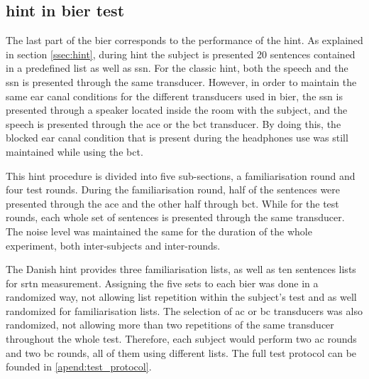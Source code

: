 \subsection{\gls{hint} in \gls{bier} test}
The last part of the \gls{bier} corresponds to the performance of the \gls{hint}. As explained in section \autoref{ssec:hint}, during \gls{hint} the subject is presented 20 sentences contained in a predefined list as well as \gls{ssn}. For the classic \gls{hint}, both the speech and the \gls{ssn} is presented through the same transducer. However, in order to maintain the same ear canal conditions for the different transducers used in \gls{bier}, the \gls{ssn} is presented through a speaker located inside the room with the subject, and the speech is presented through the  \gls{ace} or the \gls{bct} transducer. By doing this, the blocked ear canal condition that is present during the headphones use was still maintained while using the \gls{bct}.


This \gls{hint} procedure is divided into five sub-sections, a familiarisation round and four test rounds. During the familiarisation round, half of the sentences were presented through the \gls{ace} and the other half through \gls{bct}. While for the test rounds, each whole set of sentences is presented through the same transducer. The noise level was maintained the same for the duration of the whole experiment, both inter-subjects and inter-rounds.

The Danish \gls{hint} provides three familiarisation lists, as well as ten sentences lists for \gls{srtn} measurement. Assigning the five sets to each \gls{bier} was done in a randomized way, not allowing list repetition within the subject's test and as well randomized for familiarisation lists. The selection of \gls{ac} or \gls{bc} transducers was also randomized, not allowing more than two repetitions of the same transducer throughout the whole test. Therefore, each subject would perform two \gls{ac} rounds and two \gls{bc} rounds, all of them using different lists. The full test protocol can be founded in \autoref{apend:test_protocol}.























